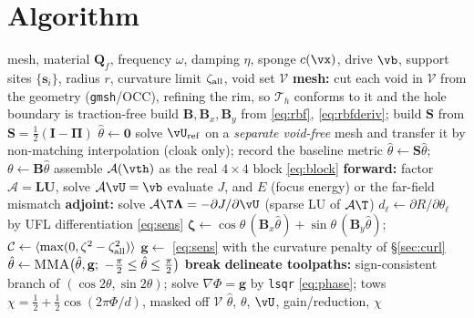 \section{Algorithm}\label{app:alg}
\begin{algorithm}[H]
\caption{Orientation design for wave control (\texttt{dolfinx})}
\label{alg:wave}
\begin{algorithmic}[1]
\Require mesh, material $\mathbf Q_f$, frequency $\omega$, damping $\eta$, sponge
  $c(\vx)$, drive $\vb$, support sites $\{\mathbf s_i\}$, radius $r$, curvature
  limit $\zeta_{\rm all}$, void set $\mathcal V$
\State \textbf{mesh:} cut each void in $\mathcal V$ from the geometry
  (\texttt{gmsh}/OCC), refining the rim, so $\mathcal T_h$ conforms to it and the
  hole boundary is traction-free 
\State build $\mathbf B,\mathbf B_x,\mathbf B_y$ from \eqref{eq:rbf},
  \eqref{eq:rbfderiv}; build $\mathbf S$ from $\mathbf S=\tfrac12(\mathbf I-\bm\Pi)$
\State $\hat\theta\gets\mathbf 0$ 
\State solve $\vU_{\rm ref}$ on a \emph{separate void-free} mesh and transfer it by
  non-matching interpolation (cloak only); record the baseline metric
 
    \State $\hat\theta\gets\mathbf S\hat\theta$;\quad
           $\theta\gets\mathbf B\hat\theta$
    \State assemble $\mathcal A(\vth)$ as the real $4\times4$ block
           \eqref{eq:block} 
    \State \textbf{forward:} factor $\mathcal A=\mathbf{LU}$, solve
           $\mathcal A\vU=\vb$
    \State evaluate $J$, and $E$ (focus energy) or the far-field mismatch
    \State \textbf{adjoint:} solve $\mathcal A\T\bm\Lambda=-\partial J/\partial\vU$
           (sparse LU of $\mathcal A\T$)
    \State $d_\ell\gets\partial R/\partial\theta_\ell$ by UFL differentiation
           \eqref{eq:sens}
    \State $\bm\zeta\gets\cos\theta\,(\mathbf B_x\hat\theta)
           +\sin\theta\,(\mathbf B_y\hat\theta)$;\quad
           $\mathcal C\gets\langle\max(0,\zeta^2-\zeta_{\rm all}^2)\rangle$
    \State $\mathbf g\gets$ \eqref{eq:sens} with the curvature penalty of \S\ref{sec:curl}
    \State $\hat\theta\gets\textsc{MMA}\bigl(\hat\theta,\mathbf g;\
           -\tfrac\pi2\le\hat\theta\le\tfrac\pi2\bigr)$
  \EndFor
   \textbf{break} 
  \EndIf
\EndFor
\State \textbf{delineate toolpaths:} sign-consistent branch of
  $(\cos2\theta,\sin2\theta)$; solve $\nabla\Phi=\mathbf g$ by \texttt{lsqr}
  \eqref{eq:phase}; tows $\chi=\tfrac12+\tfrac12\cos(2\pi\Phi/d)$, masked off
  $\mathcal V$
\State \Return $\hat\theta$, $\theta$, $\vU$, gain/reduction, $\chi$
\end{algorithmic}
\end{algorithm}
